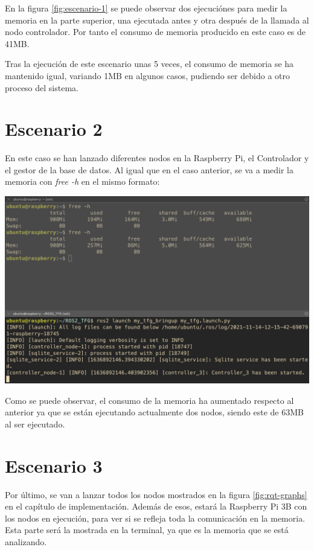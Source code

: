 En la figura \ref{fig:escenario-1} se puede observar dos ejecuciónes para medir la memoria en la parte superior, una ejecutada antes y otra después de la llamada al nodo controlador. Por tanto el consumo de memoria producido en este caso es de 41MB. 

Tras la ejecución de este escenario unas 5 veces, el consumo de memoria se ha mantenido igual, variando 1MB en algunos casos, pudiendo ser debido a otro proceso del sistema.

\section{Escenario 2}

En este caso se han lanzado diferentes nodos en la Raspberry Pi, el Controlador y el gestor de la base de datos. Al igual que en el caso anterior, se va a medir la memoria con \textit{free -h} en el mismo formato:

\newpage

\begin{center}
    \centering
    \includegraphics[width=\textwidth]{img/09-Escenario2.png}
    \label{fig:escenario-2}
\end{center}

Como se puede observar, el consumo de la memoria ha aumentado respecto al anterior ya que se están ejecutando actualmente dos nodos, siendo este de 63MB al ser ejecutado.

\section{Escenario 3}

Por último, se van a lanzar todos los nodos mostrados en la figura \ref{fig:rqt-graphs} en el capítulo de implementación. Además de esos, estará la Raspberry Pi 3B con los nodos en ejecución, para ver si se refleja toda la comunicación en la memoria. Esta parte será la mostrada en la terminal, ya que es la memoria que se está analizando.

